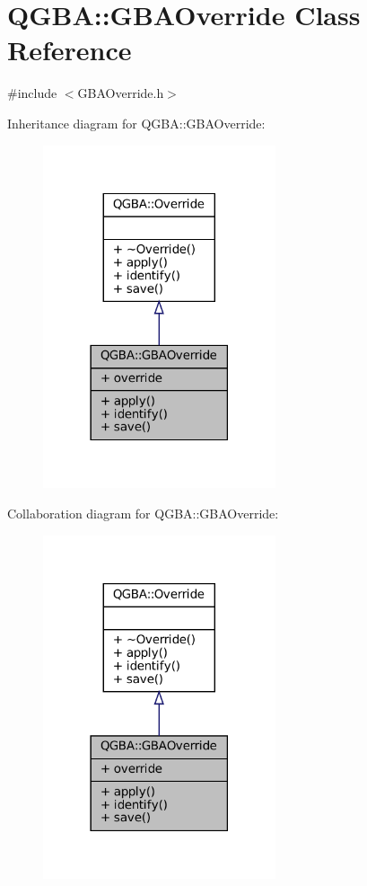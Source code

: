 \hypertarget{class_q_g_b_a_1_1_g_b_a_override}{}\section{Q\+G\+BA\+:\+:G\+B\+A\+Override Class Reference}
\label{class_q_g_b_a_1_1_g_b_a_override}


{\ttfamily \#include $<$G\+B\+A\+Override.\+h$>$}



Inheritance diagram for Q\+G\+BA\+:\+:G\+B\+A\+Override\+:
\nopagebreak
\begin{figure}[H]
\begin{center}
\leavevmode
\includegraphics[width=194pt]{class_q_g_b_a_1_1_g_b_a_override__inherit__graph}
\end{center}
\end{figure}


Collaboration diagram for Q\+G\+BA\+:\+:G\+B\+A\+Override\+:
\nopagebreak
\begin{figure}[H]
\begin{center}
\leavevmode
\includegraphics[width=194pt]{class_q_g_b_a_1_1_g_b_a_override__coll__graph}
\end{center}
\end{figure}
